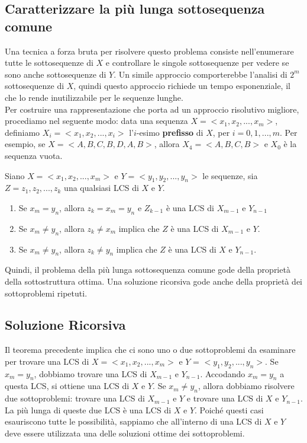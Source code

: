 \subsection{Caratterizzare la più lunga sottosequenza comune}

Una tecnica a forza bruta per risolvere questo problema consiste
nell'enumerare tutte le sottosequenze di $X$ e controllare le singole
sottosequenze per vedere se sono anche sottosequenze di $Y$. Un simile
approccio comporterebbe l'analisi di $2^m$ sottosequenze di $X$,
quindi questo approccio richiede un tempo esponenziale, il che lo rende
inutilizzabile per le sequenze lunghe.\\

Per costruire una rappresentazione che porta ad un approccio risolutivo
migliore, procediamo nel seguente modo: data una sequenza
$X = <x_1, x_2, ..., x_m>$, definiamo $X_i = <x_1, x_2, ..., x_i>$
l'$i$-esimo \textbf{prefisso} di $X$, per $i=0,1,...,m$. Per
esempio, se $X = <A,B,C,B,D,A,B>$, allora $X_4 = <A,B,C,B>$ e
$X_0$ è la sequenza vuota.

\begin{theorem}
  Siano $X = <x_1, x_2, ..., x_m>$ e $Y = <y_1, y_2, ..., y_n>$ le
  sequenze, sia $Z = z_1, z_2, ..., z_k$ una qualsiasi LCS di $X$ e
  $Y$.

  \begin{enumerate}
    \item Se $x_m = y_n$, allora $z_k = x_m = y_n$ e $Z_{k-1}$ è
          una LCS di $X_{m-1}$ e $Y_{n-1}$
    \item Se $x_m \ne y_n$, allora
          $z_k \ne x_m$ implica che $Z$ è una LCS di $X_{m-1}$ e $Y$.
    \item Se $x_m \ne y_n$, allora $z_k \ne y_n$ implica che $Z$ è una LCS
          di $X$ e $Y_{n-1}$.
  \end{enumerate}
\end{theorem}

Quindi, il problema della più lunga sottosequenza comune gode della
proprietà della sottostruttura ottima. Una soluzione ricorsiva gode
anche della proprietà dei sottoproblemi ripetuti.

\subsection{Soluzione Ricorsiva}

Il teorema precedente implica che ci sono uno o due sottoproblemi da
esaminare per trovare una LCS di $X = <x_1, x_2, ..., x_m>$ e $Y$ =
$<y_1, y_2, ..., y_n>$. Se $x_m = y_n$, dobbiamo trovare una LCS di
$X_{m-1}$ e $Y_{n-1}$. Accodando $x_m = y_n$ a questa LCS, si
ottiene una LCS di $X$ e $Y$. Se $x_m \neq y_n$, allora dobbiamo
risolvere due sottoproblemi: trovare una LCS di $X_{m-1}$ e $Y$ e
trovare una LCS di $X$ e $Y_{n-1}$. La più lunga di queste due LCS è
una LCS di $X$ e $Y$. Poiché questi casi esauriscono tutte le
possibilità, sappiamo che all'interno di una LCS di $X$ e $Y$ deve
essere utilizzata una delle soluzioni ottime dei sottoproblemi.\\

